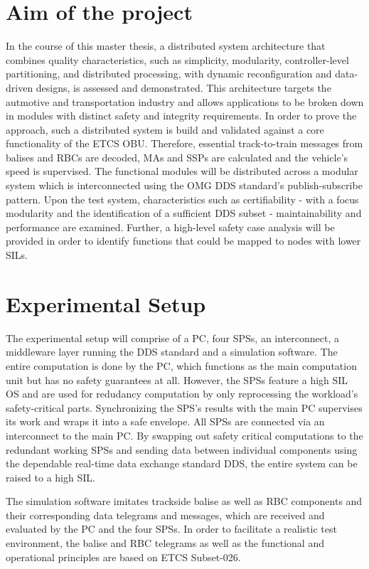 \documentclass[a4paper, 12pt]{scrartcl}
\begin{document}
\section*{Aim of the project}
In the course of this master thesis, a distributed system architecture that combines quality characteristics, such as simplicity, modularity, control\-ler-level partitioning, and distributed processing, with dynamic reconfiguration and data-driven designs, is assessed and demonstrated.
This architecture targets the autmotive and transportation industry and allows applications to be broken down in modules with distinct safety and integrity requirements.
In order to prove the approach, such a distributed system is build and validated against a core functionality of the \ac{ETCS OBU}.
Therefore, essential track-to-train messages from balises and \acp{RBC} are decoded, \acp{MA} and \acp{SSP} are calculated and the vehicle's speed is supervised.
The functional modules will be distributed across a modular system which is interconnected using the \ac{OMG} \ac{DDS} standard's publish-subscribe pattern.
Upon the test system, characteristics such as certifiability - with a focus modularity and the identification of a sufficient \ac{DDS} subset - maintainability and performance are examined.
Further, a high-level safety case analysis will be provided in order to identify functions that could be mapped to nodes with lower \acp{SIL}.

\section*{Experimental Setup}
The experimental setup will comprise of a PC, four \acp{SPS}, an interconnect, a middleware layer running the \ac{DDS} standard and a simulation software.
The entire computation is done by the PC, which functions as the main computation unit but has no safety guarantees at all.
However, the \acp{SPS} feature a high \ac{SIL} \ac{OS} and are used for redudancy computation by only reprocessing the workload's safety-critical parts.
Synchronizing the \ac{SPS}'s results with the main PC supervises its work and wraps it into a safe envelope.
All \acp{SPS} are connected via an interconnect to the main PC.
By swapping out safety critical computations to the redundant working \acp{SPS} and sending data between individual components using the dependable real-time data exchange standard \ac{DDS}, the entire system can be raised to a high \ac{SIL}.

The simulation software imitates trackside balise as well as \ac{RBC} components and their corresponding data telegrams and messages, which are received and evaluated by the PC and the four \acp{SPS}.
In order to facilitate a realistic test environment, the balise and \ac{RBC} telegrams as well as the functional and operational principles are based on \ac{ETCS} Subset-026.
\end{document}
